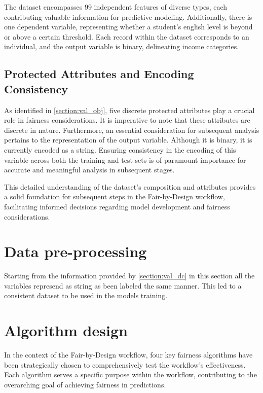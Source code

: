 The dataset encompasses 99 independent features of diverse types, each contributing valuable information for predictive modeling. Additionally, there is one dependent variable, representing whether a student's english level is beyond or above a certain threshold. Each record within the dataset corresponds to an individual, and the output variable is binary, delineating income categories.

\subsection{Protected Attributes and Encoding Consistency}

As identified in \cref{section:val_obj}, five discrete protected attributes play a crucial role in fairness considerations. It is imperative to note that these attributes are discrete in nature. Furthermore, an essential consideration for subsequent analysis pertains to the representation of the output variable. Although it is binary, it is currently encoded as a string. Ensuring consistency in the encoding of this variable across both the training and test sets is of paramount importance for accurate and meaningful analysis in subsequent stages.

This detailed understanding of the dataset's composition and attributes provides a solid foundation for subsequent steps in the Fair-by-Design workflow, facilitating informed decisions regarding model development and fairness considerations.

\section{Data pre-processing}

Starting from the information provided by \cref{section:val_dc} in this section all the variables represend as string as been labeled the same manner. This led to a consistent dataset to be used in the models training.

\section{Algorithm design}
\label{section:val_alg}

In the context of the Fair-by-Design workflow, four key fairness algorithms have been strategically chosen to comprehensively test the workflow's effectiveness. Each algorithm serves a specific purpose within the workflow, contributing to the overarching goal of achieving fairness in predictions.

